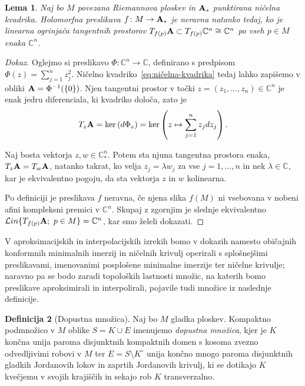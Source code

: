 \documentclass[12pt,a4paper,twoside]{article}
\theoremstyle{definition} %
\newtheorem{definicija}{Definicija}[section]
\newenvironment{dokaz}[1][Dokaz]{\begin{proof}[#1]}{\end{proof}}
\theoremstyle{plain} %
\newtheorem{lema}[definicija]{Lema}
\numberwithin{equation}{section}  %
\newcommand{\C}{\mathbb C}
\begin{document}
\begin{lema} \label{lema:neravna f}
Naj bo $M$ povezana Riemannova ploskev in $\textbf{\textup{A}}_{*}$ punktirana ničelna kvadrika.
Holomorfna preslikava $f \colon M \to \textbf{\textup{A}}_{*}$ je neravna natanko tedaj, ko je linearna ogrinjača tangentnih prostorov 
$T_{f(p)} \textbf{\textup{A}} \subset T_{f(p)} \C^{n} \cong \mathbb{C}^{n}$ po vseh $p \in M$ enaka $\C^{n}$.
\end{lema}

\begin{dokaz}
Oglejmo si preslikavo 
$\Phi \colon \C^{n} \to \C$, definirano s predpisom $\Phi(z) = \sum_{j=1}^{n} z_{j}^{2}$.
Ničelno kvadriko~\eqref{eq:ničelna-kvadrika} tedaj lahko zapišemo v obliki $\textbf{\textup{A}} = \Phi^{-1}( \{0\} )$.
Njen tangentni prostor v točki $z = (z_{1}, \dots , z_{n}) \in \C^{n}$ je enak jedru diferenciala, ki kvadriko določa, zato je
\begin{gather*}
T_{z} \textbf{\textup{A}} = \ker \left(d \Phi_{z} \right) = \ker \left(z \mapsto \sum_{j=1}^{n} z_{j} dz_{j} \right).
\end{gather*}

Naj bosta vektorja $z, w \in \C_{*}^{n}$. Potem sta njuna tangentna prostora enaka, $ T_{z} \textbf{\textup{A}} = T_{w} \textbf{\textup{A}} $, natanko takrat, ko velja $z_{j} = \lambda w_{j}$ za vse $j = 1, \dots , n$ in nek $\lambda \in \C$, kar je ekvivalentno pogoju, da sta vektorja $z$ in $w$ kolinearna.

Po definiciji je preslikava $f$ neravna, če njena slika $f(M)$ ni vsebovana v nobeni afini kompleksni premici v $\C^{n}$. Skupaj z zgornjim je slednje ekvivalentno 
$ \mathcal{L}in \{T_{f(p)} \textbf{\textup{A}} ; \ p \in M \} = \C^{n}$, kar smo želeli dokazati.
\end{dokaz}

V aproksimacijskih in interpolacijskih izrekih bomo v dokazih namesto običajnih konformnih minimalnih imerzij in ničelnih krivulj operirali s splošnejšimi preslikavami, imenovanimi posplošene minimalne imerzije ter ničelne krivulje; naravno pa se bodo zaradi topoloških lastnosti množic, na katerih bomo preslikave aproksimirali in interpolirali, pojavile tudi množice iz naslednje definicije.

\begin{definicija} [Dopustna množica] \label{def:dopustna-mnozica}
Naj bo $M$ gladka ploskev. Kompaktno podmnožico v $M$ oblike $S = K \cup E$ imenujemo \emph{dopustna množica}, kjer je $K$ končna unija paroma disjunktnih kompaktnih domen s kosoma zvezno odvedljivimi robovi v $M$ ter $E = S \setminus K^\circ$ unija končno mnogo paroma disjunktnih gladkih Jordanovih lokov in zaprtih Jordanovih krivulj, ki se dotikajo $K$ kvečjemu v svojih krajiščih in sekajo rob $K$ transverzalno.
\end{definicija}
\end{document}
